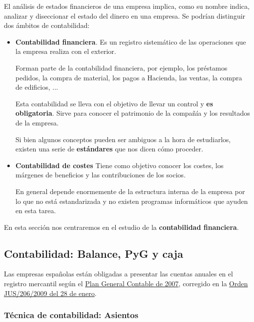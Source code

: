 \documentclass[nochap,palatino,shortheader]{apuntes}
\begin{document}
El análisis de estados financieros de una empresa implica, como su nombre indica, analizar y diseccionar el estado del dinero en una empresa. Se podrían distinguir dos ámbitos de contabilidad:

\begin{itemize}
\item \textbf{Contabilidad financiera}. Es un registro sistemático de las operaciones que la empresa realiza con el exterior.

Forman parte de la contabilidad financiera, por ejemplo, los préstamos pedidos, la compra de material, los pagos a Hacienda, las ventas, la compra de edificios, ...

Esta contabilidad se lleva con el objetivo de llevar un control y \textbf{es obligatoria}. Sirve para conocer el patrimonio de la compañía y los resultados de la empresa.

Si bien algunos conceptos pueden ser ambiguos a la hora de estudiarlos, existen una serie de \textbf{estándares} que nos dicen cómo proceder.

\item \textbf{Contabilidad de costes} Tiene como objetivo conocer los costes, los márgenes de beneficios y las contribuciones de los socios.

En general depende enormemente de la estructura interna de la empresa por lo que no está estandarizada y no existen programas informáticos que ayuden en esta tarea.
\end{itemize}

En esta sección nos centraremos en el estudio de la \textbf{contabilidad financiera}.

\subsection{Contabilidad: Balance, PyG y caja}
\label{sec:Contabilidad}

Las empresas españolas están obligadas a presentar las cuentas anuales en el registro mercantil según el \href{https://www.boe.es/buscar/doc.php?id=BOE-A-2007-13023}{Plan General Contable de 2007}, corregido en la \href{https://www.boe.es/boe/dias/2009/02/10/pdfs/BOE-A-2009-2276.pdf}{Orden JUS/206/2009 del 28 de enero}.

\subsubsection{Técnica de contabilidad: Asientos}
\end{document}
